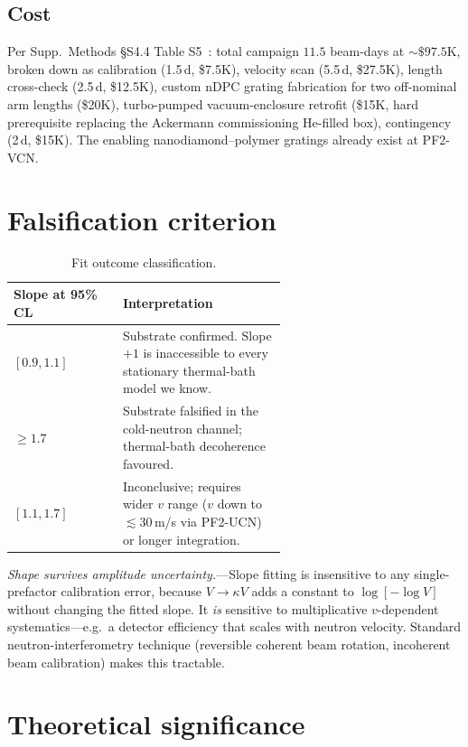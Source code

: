 \documentclass[aps,prl,twocolumn,superscriptaddress,nofootinbib,10pt]{revtex4-2}
\begin{document}
\subsection{Cost}
Per Supp.~Methods \S S4.4 Table S5~\cite{Alnitak2026Supp}: total
campaign $11.5$ beam-days at $\sim\$97.5$K, broken down as
calibration (1.5\,d, \$7.5K), velocity scan (5.5\,d, \$27.5K),
length cross-check (2.5\,d, \$12.5K), custom nDPC grating
fabrication for two off-nominal arm lengths (\$20K),
turbo-pumped vacuum-enclosure retrofit (\$15K, hard prerequisite
replacing the Ackermann commissioning He-filled box),
contingency (2\,d, \$15K).  The enabling nanodiamond--polymer
gratings already exist at PF2-VCN.

\section{Falsification criterion}

\begin{table}[htbp]
  \centering
  \renewcommand{\arraystretch}{1.1}
  \begin{tabular}{@{}lp{0.6\linewidth}@{}}
    \toprule
    Slope at 95\% CL & Interpretation \\
    \midrule
    $[0.9, 1.1]$ & Substrate confirmed. Slope $+1$ is inaccessible
    to every stationary thermal-bath model we know. \\
    $\geq 1.7$ & Substrate falsified in the cold-neutron channel;
    thermal-bath decoherence favoured. \\
    $[1.1, 1.7]$ & Inconclusive; requires wider $v$ range ($v$ down
    to $\lesssim 30\,$m/s via PF2-UCN) or longer integration. \\
    \bottomrule
  \end{tabular}
  \caption{Fit outcome classification.}
  \label{tab:outcome}
\end{table}

\textit{Shape survives amplitude uncertainty.}---Slope fitting is
insensitive to any single-prefactor calibration error, because
$V \to \kappa V$ adds a constant to $\log[-\log V]$ without changing
the fitted slope.  It \emph{is} sensitive to multiplicative
$v$-dependent systematics---e.g.\ a detector efficiency that scales
with neutron velocity.  Standard neutron-interferometry technique
(reversible coherent beam rotation, incoherent beam calibration)
makes this tractable.

\section{Theoretical significance}
\end{document}
